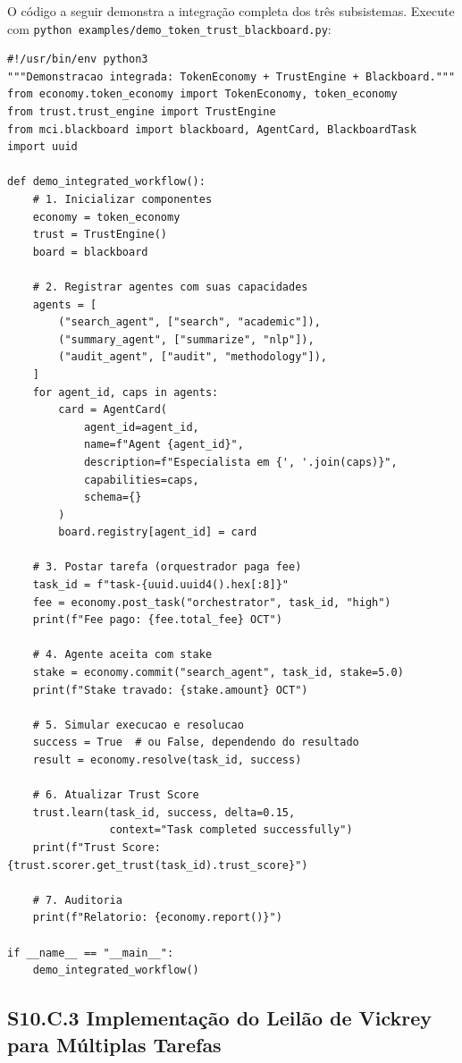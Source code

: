 O código a seguir demonstra a integração completa dos três subsistemas. Execute com \texttt{python examples/demo\_token\_trust\_blackboard.py}:

\begin{verbatim}
#!/usr/bin/env python3
"""Demonstracao integrada: TokenEconomy + TrustEngine + Blackboard."""
from economy.token_economy import TokenEconomy, token_economy
from trust.trust_engine import TrustEngine
from mci.blackboard import blackboard, AgentCard, BlackboardTask
import uuid

def demo_integrated_workflow():
    # 1. Inicializar componentes
    economy = token_economy
    trust = TrustEngine()
    board = blackboard

    # 2. Registrar agentes com suas capacidades
    agents = [
        ("search_agent", ["search", "academic"]),
        ("summary_agent", ["summarize", "nlp"]),
        ("audit_agent", ["audit", "methodology"]),
    ]
    for agent_id, caps in agents:
        card = AgentCard(
            agent_id=agent_id,
            name=f"Agent {agent_id}",
            description=f"Especialista em {', '.join(caps)}",
            capabilities=caps,
            schema={}
        )
        board.registry[agent_id] = card

    # 3. Postar tarefa (orquestrador paga fee)
    task_id = f"task-{uuid.uuid4().hex[:8]}"
    fee = economy.post_task("orchestrator", task_id, "high")
    print(f"Fee pago: {fee.total_fee} OCT")

    # 4. Agente aceita com stake
    stake = economy.commit("search_agent", task_id, stake=5.0)
    print(f"Stake travado: {stake.amount} OCT")

    # 5. Simular execucao e resolucao
    success = True  # ou False, dependendo do resultado
    result = economy.resolve(task_id, success)

    # 6. Atualizar Trust Score
    trust.learn(task_id, success, delta=0.15,
                context="Task completed successfully")
    print(f"Trust Score: {trust.scorer.get_trust(task_id).trust_score}")

    # 7. Auditoria
    print(f"Relatorio: {economy.report()}")

if __name__ == "__main__":
    demo_integrated_workflow()
\end{verbatim}

\subsection*{S10.C.3 Implementação do Leilão de Vickrey para Múltiplas Tarefas}

